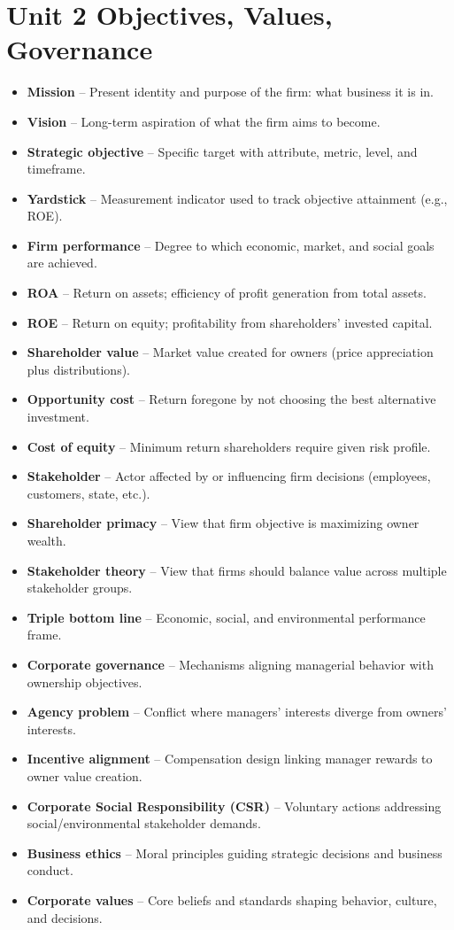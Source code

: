 \documentclass[10pt,a4paper]{article}
\newcommand{\vocab}[2]{\item \textbf{\textcolor{pinkmain}{#1}} -- #2}
\begin{document}
\section*{Unit 2 Objectives, Values, Governance}
\begin{itemize}
\vocab{Mission}{Present identity and purpose of the firm: what business it is in.}
\vocab{Vision}{Long-term aspiration of what the firm aims to become.}
\vocab{Strategic objective}{Specific target with attribute, metric, level, and timeframe.}
\vocab{Yardstick}{Measurement indicator used to track objective attainment (e.g., ROE).}
\vocab{Firm performance}{Degree to which economic, market, and social goals are achieved.}
\vocab{ROA}{Return on assets; efficiency of profit generation from total assets.}
\vocab{ROE}{Return on equity; profitability from shareholders' invested capital.}
\vocab{Shareholder value}{Market value created for owners (price appreciation plus distributions).}
\vocab{Opportunity cost}{Return foregone by not choosing the best alternative investment.}
\vocab{Cost of equity}{Minimum return shareholders require given risk profile.}
\vocab{Stakeholder}{Actor affected by or influencing firm decisions (employees, customers, state, etc.).}
\vocab{Shareholder primacy}{View that firm objective is maximizing owner wealth.}
\vocab{Stakeholder theory}{View that firms should balance value across multiple stakeholder groups.}
\vocab{Triple bottom line}{Economic, social, and environmental performance frame.}
\vocab{Corporate governance}{Mechanisms aligning managerial behavior with ownership objectives.}
\vocab{Agency problem}{Conflict where managers' interests diverge from owners' interests.}
\vocab{Incentive alignment}{Compensation design linking manager rewards to owner value creation.}
\vocab{Corporate Social Responsibility (CSR)}{Voluntary actions addressing social/environmental stakeholder demands.}
\vocab{Business ethics}{Moral principles guiding strategic decisions and business conduct.}
\vocab{Corporate values}{Core beliefs and standards shaping behavior, culture, and decisions.}
\end{itemize}
\end{document}
